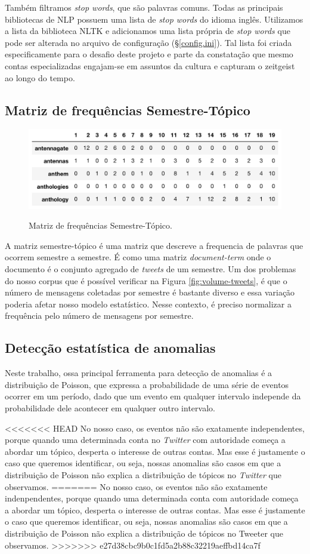 \documentclass[paper=a4, fontsize=11pt]{scrartcl}
\numberwithin{equation}{section}		%
\numberwithin{figure}{section}			%
\numberwithin{table}{section}				%
\begin{document}
Também filtramos \emph{stop words}, que são palavras comuns. Todas as principais bibliotecas de NLP possuem uma lista de \emph{stop words} do idioma inglês. Utilizamos a lista da biblioteca NLTK \citep{nltk} e adicionamos uma lista própria de \emph{stop words} que pode ser alterada no arquivo de configuração (\S \ref{config.ini}). Tal lista foi criada especificamente para o desafio deste projeto e parte da constatação que mesmo contas especializadas engajam-se em assuntos da cultura e capturam o zeitgeist ao longo do tempo.

\subsection{Matriz de frequências Semestre-Tópico}
\begin{figure}[h]
	\centering
	\caption{Matriz de frequências Semestre-Tópico.}
	\includegraphics[width=.8\columnwidth]{sem-term}
	\label{fig:sem-term}
\end{figure}

A matriz semestre-tópico é uma matriz que descreve a frequencia de palavras que ocorrem semestre a semestre. É como uma matriz \emph{document-term} onde o documento é o conjunto agregado de \emph{tweets} de um semestre. 
Um dos problemas do nosso corpus que é possível verificar na Figura \ref{fig:volume-tweets}, é que o número de mensagens coletadas por semestre é bastante diverso e essa variação poderia afetar nosso modelo estatístico. Nesse contexto, é preciso normalizar a frequência pelo número de mensagens por semestre.
\subsection{Detecção estatística de anomalias}
Neste trabalho, ossa principal ferramenta para detecção de anomalias é a distribuição de Poisson, que expressa a probabilidade de uma série de eventos ocorrer em um período, dado que um evento em qualquer intervalo independe da probabilidade dele acontecer em qualquer outro intervalo.

<<<<<<< HEAD
No nosso caso, os eventos não são exatamente independentes, porque quando uma determinada conta no \emph{Twitter} com autoridade começa a abordar um tópico, desperta o interesse de outras contas. Mas esse é justamente o caso que queremos identificar, ou seja, nossas anomalias são casos em que a distribuição de Poisson não explica a distribuição de tópicos no \emph{Twitter} que observamos.
=======
No nosso caso, os eventos não são exatamente indenpendentes, porque quando uma determinada conta com autoridade começa a abordar um tópico, desperta o interesse de outras contas. Mas esse é justamente o caso que queremos identificar, ou seja, nossas anomalias são casos em que a distribuição de Poisson não explica a distribuição de tópicos no Tweeter que observamos.
>>>>>>> e27d38cbc9b0c1fd5a2b88c32219aeffbd14ca7f
\end{document}
